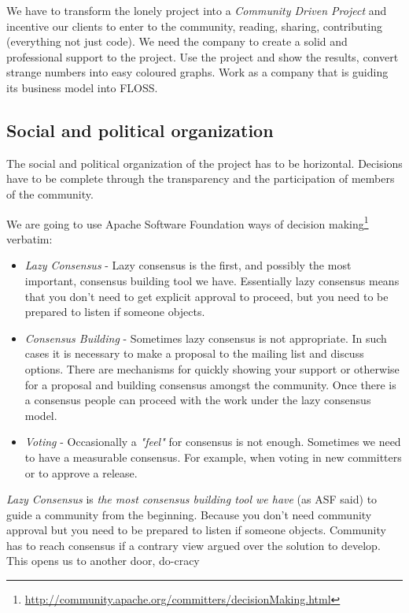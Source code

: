 \documentclass[11pt]{scrartcl}
\begin{document}
\par We have to transform the lonely project into a \emph{Community Driven Project} and incentive our clients to enter to the community, reading, sharing, contributing (everything not just code). We need the company to create a solid and professional support to the project. Use the project and show the results, convert strange numbers into easy coloured graphs. Work as a company that is guiding its business model into FLOSS.


\subsection{Social and political organization}
\label{sub:social-political}

\par The social and political organization of the project has to be horizontal. Decisions have to be complete through the transparency and the participation of members of the community.

\par We are going to use Apache Software Foundation ways of decision making\footnote{\url{http://community.apache.org/committers/decisionMaking.html}} verbatim:

\begin{itemize}
	\item \emph{Lazy Consensus} - Lazy consensus is the first, and possibly the most important, consensus building tool we have. Essentially lazy consensus means that you don't need to get explicit approval to proceed, but you need to be prepared to listen if someone objects.

	\item \emph{Consensus Building} - Sometimes lazy consensus is not appropriate. In such cases it is necessary to make a proposal to the mailing list and discuss options. There are mechanisms for quickly showing your support or otherwise for a proposal and building consensus amongst the community. Once there is a consensus people can proceed with the work under the lazy consensus model.

	\item \emph{Voting} - Occasionally a \emph{"feel"} for consensus is not enough. Sometimes we need to have a measurable consensus. For example, when voting in new committers or to approve a release.
\end{itemize}

\par \emph{Lazy Consensus} is \emph{the most consensus building tool we have} (as ASF said) to guide a community from the beginning. Because you don't need community approval but you need to be prepared to listen if someone objects. Community has to reach consensus if a contrary view argued over the solution to develop. This opens us to another door, do-cracy 
\end{document}
